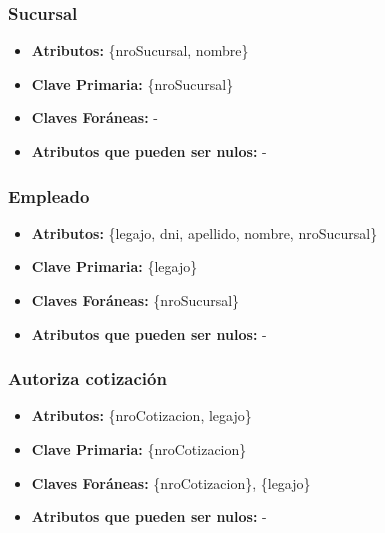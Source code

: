 \documentclass[a4paper,11pt]{article}
\begin{document}
\subsubsection{Sucursal}

\begin{itemize}

	\item \textbf{Atributos:} \{nroSucursal, nombre\}
	
	\item \textbf{Clave Primaria:} \{nroSucursal\}
	
	\item \textbf{Claves Foráneas:} -

	\item \textbf{Atributos que pueden ser nulos:} -
	
\end{itemize}

\subsubsection{Empleado}

\begin{itemize}

	\item \textbf{Atributos:} \{legajo, dni, apellido, nombre, nroSucursal\}
	
	\item \textbf{Clave Primaria:} \{legajo\}
	
	\item \textbf{Claves Foráneas:} \{nroSucursal\}

	\item \textbf{Atributos que pueden ser nulos:} -
	
\end{itemize}

\subsubsection{Autoriza cotización}

\begin{itemize}

	\item \textbf{Atributos:} \{nroCotizacion, legajo\}
	
	\item \textbf{Clave Primaria:} \{nroCotizacion\}
	
	\item \textbf{Claves Foráneas:} \{nroCotizacion\}, \{legajo\}
	
	\item \textbf{Atributos que pueden ser nulos:} -
	
\end{itemize}
\end{document}

